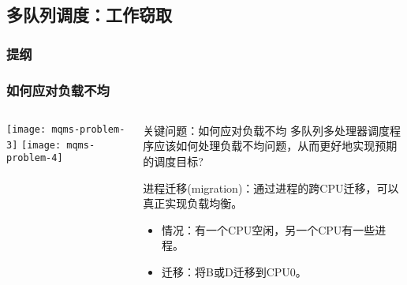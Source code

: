 \subsection{多队列调度：工作窃取}
\begin{frame}
\frametitle{提纲} %
\tableofcontents %

\end{frame}
\begin{frame}
	\frametitle{如何应对负载不均}
	\begin{columns}
		\begin{column}{.5\textwidth}
			\Large \centering
			\texttt{[image: mqms-problem-3]}
			\texttt{[image: mqms-problem-4]}	
		\end{column}
		
		\begin{column}{.5\textwidth}
			\begin{block}{关键问题：如何应对负载不均}
			多队列多处理器调度程序应该如何处理负载不均问题，从而更好地实现预期的调度目标?
			\end{block} 
			\normalsize
			进程迁移(migration)：通过进程的跨CPU迁移，可以真正实现负载均衡。 \pause
			
			\begin{itemize}
				\item 情况：有一个CPU空闲，另一个CPU有一些进程。
				\item 迁移：将B或D迁移到CPU0。
		
			\end{itemize}
			\Large

		\end{column}
	\end{columns}
\end{frame}




